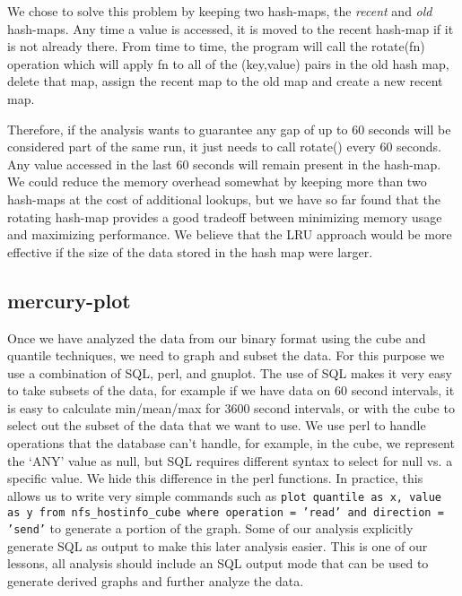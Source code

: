 We chose to solve this problem by keeping two hash-maps, the {\it
recent} and {\it old} hash-maps.  Any time a value is accessed, it is
moved to the recent hash-map if it is not already there.  From time to
time, the program will call the rotate(fn) operation which will apply
fn to all of the (key,value) pairs in the old hash map, delete that map,
assign the recent map to the old map and create a new recent map.

Therefore, if the analysis wants to guarantee any gap of up to 60
seconds will be considered part of the same run, it just needs to call
rotate() every 60 seconds.  Any value accessed in the last 60 seconds
will remain present in the hash-map.  We could reduce the memory
overhead somewhat by keeping more than two hash-maps at the cost of
additional lookups, but we have so far found that the rotating
hash-map provides a good tradeoff between minimizing memory usage and
maximizing performance.  We believe that the LRU approach would be
more effective if the size of the data stored in the hash map were
larger.

\subsection{mercury-plot}


Once we have analyzed the data from our binary format using the cube
and quantile techniques, we need to graph and subset the data.  For
this purpose we use a combination of SQL, perl, and gnuplot.  The use
of SQL makes it very easy to take subsets of the data, for example if
we have data on 60 second intervals, it is easy to calculate
min/mean/max for 3600 second intervals, or with the cube to select out
the subset of the data that we want to use.  We use perl to handle
operations that the database can't handle, for example, in the cube,
we represent the `ANY' value as null, but SQL requires different
syntax to select for null vs. a specific value.  We hide this
difference in the perl functions.  In practice, this allows us to
write very simple commands such as {\tt plot quantile as x, value as y
from nfs\_hostinfo\_cube where operation = 'read' and direction =
'send'} to generate a portion of the graph.  Some of our analysis
explicitly generate SQL as output to make this later analysis easier.
This is one of our lessons, all analysis should include an SQL output
mode that can be used to generate derived graphs and further analyze
the data.
